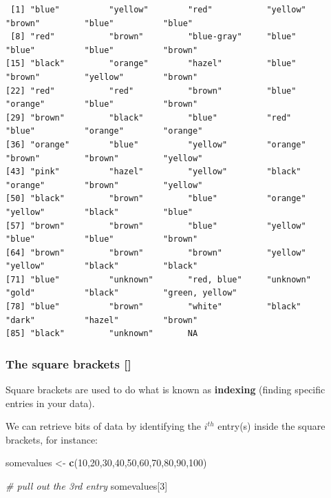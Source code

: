 \documentclass[]{book}
\newenvironment{Shaded}{\begin{snugshade}}{\end{snugshade}}
\newcommand{\CommentTok}[1]{\textcolor[rgb]{0.56,0.35,0.01}{\textit{#1}}}
\newcommand{\DecValTok}[1]{\textcolor[rgb]{0.00,0.00,0.81}{#1}}
\newcommand{\KeywordTok}[1]{\textcolor[rgb]{0.13,0.29,0.53}{\textbf{#1}}}
\newcommand{\NormalTok}[1]{#1}
\newcommand{\StringTok}[1]{\textcolor[rgb]{0.31,0.60,0.02}{#1}}
\begin{document}
\begin{verbatim}
 [1] "blue"          "yellow"        "red"           "yellow"        "brown"         "blue"          "blue"         
 [8] "red"           "brown"         "blue-gray"     "blue"          "blue"          "blue"          "brown"        
[15] "black"         "orange"        "hazel"         "blue"          "brown"         "yellow"        "brown"        
[22] "red"           "red"           "brown"         "blue"          "orange"        "blue"          "brown"        
[29] "brown"         "black"         "blue"          "red"           "blue"          "orange"        "orange"       
[36] "orange"        "blue"          "yellow"        "orange"        "brown"         "brown"         "yellow"       
[43] "pink"          "hazel"         "yellow"        "black"         "orange"        "brown"         "yellow"       
[50] "black"         "brown"         "blue"          "orange"        "yellow"        "black"         "blue"         
[57] "brown"         "brown"         "blue"          "yellow"        "blue"          "blue"          "brown"        
[64] "brown"         "brown"         "brown"         "yellow"        "yellow"        "black"         "black"        
[71] "blue"          "unknown"       "red, blue"     "unknown"       "gold"          "black"         "green, yellow"
[78] "blue"          "brown"         "white"         "black"         "dark"          "hazel"         "brown"        
[85] "black"         "unknown"       NA             
\end{verbatim}

\hypertarget{the-square-brackets}{%
\subsubsection*{The square brackets {[}{]}}\label{the-square-brackets}}

Square brackets are used to do what is known as \textbf{indexing} (finding specific entries in your data).

We can retrieve bits of data by identifying the \(i^{th}\) entry(s) inside the square brackets, for instance:

\begin{Shaded}
\begin{Highlighting}[]
\NormalTok{somevalues <-}\StringTok{ }\KeywordTok{c}\NormalTok{(}\DecValTok{10}\NormalTok{,}\DecValTok{20}\NormalTok{,}\DecValTok{30}\NormalTok{,}\DecValTok{40}\NormalTok{,}\DecValTok{50}\NormalTok{,}\DecValTok{60}\NormalTok{,}\DecValTok{70}\NormalTok{,}\DecValTok{80}\NormalTok{,}\DecValTok{90}\NormalTok{,}\DecValTok{100}\NormalTok{)}

\CommentTok{# pull out the 3rd entry}
\NormalTok{somevalues[}\DecValTok{3}\NormalTok{]}
\end{Highlighting}
\end{Shaded}
\end{document}
